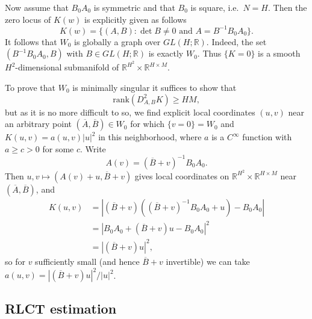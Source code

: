 \documentclass{article} %
\begin{document}
Now assume that $B_0A_0$ is symmetric and that $B_0$ is square,
i.e.\ $N = H$.  Then the zero locus of $K(w)$ is explicitly given as
follows
$$
K(w) = \{ (A, B) : \det B \neq 0 \mbox{ and } A = B^{-1}B_0A_0 \}.
$$
It follows that $W_0$ is globally a graph over $GL(H;
\mathbb{R})$.  Indeed, the set $(B^{-1}B_0 A_0, B)$ with $B \in GL(H;
\mathbb{R})$ is exactly $W_0$.  Thus $\{ K = 0\}$ is a smooth
$H^2$-dimensional submanifold of $\mathbb{R}^{H^2} \times
\mathbb{R}^{H \times M}$.  

To prove that $W_0$ is minimally singular it suffices to show that
$$
\mathrm{rank} ( D^2_{A,B}K) \ge HM,
$$
but as it is no more difficult to so, we find explicit local
coordinates $(u, v)$ near an arbitrary point $(\overline{A},
\overline{B}) \in W_0$ for which $\{ v = 0 \} = W_0$
and $K(u, v) = a(u,v)|u|^2$ in this neighborhood, where $a$ is a
$C^\infty$ function with $a \ge c > 0$ for some $c$.  Write
$$
A(v) = (\overline{B} + v)^{-1}B_0 A_0.
$$
Then $u, v \mapsto (A(v) + u, \overline{B} + v)$ gives local
coordinates on $\mathbb{R}^{H^2} \times
\mathbb{R}^{H \times M}$ near $(\overline{A}, \overline{B})$, and
\begin{equation*}
\begin{split}
K(u, v) &= | (\overline{B} + v)( (\overline{B} + v)^{-1}B_0 A_0 + u) -
B_0 A_0 | \\
&= | B_0 A_0 +  (\overline{B} + v) u -
B_0 A_0 |^2 \\
&= | (\overline{B} + v) u |^2,
\end{split}
\end{equation*}
so for $v$ sufficiently small (and hence $\overline{B} + v$
invertible) we can take $a(u,v) = | (\overline{B} + v) u |^2 /
|u|^2$.  


\subsection{RLCT estimation} \label{appendix:RLCT_estimation}

\end{document}
